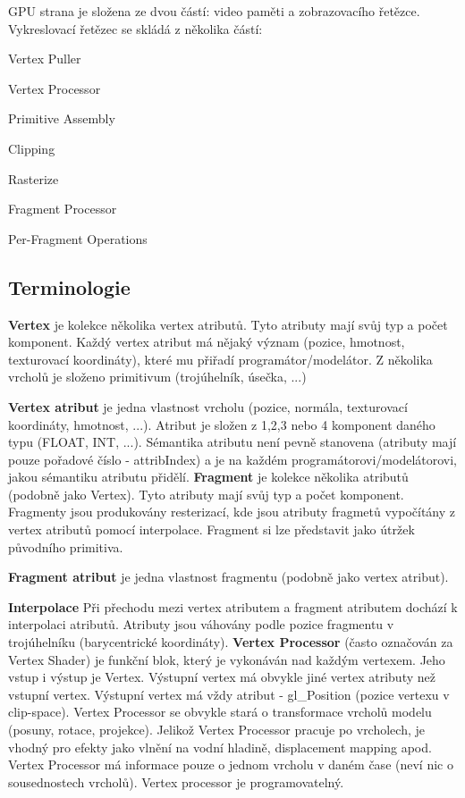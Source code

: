 G\+P\+U strana je složena ze dvou částí\+: video paměti a zobrazovacího řetězce. Vykreslovací řetězec se skládá z několika částí\+:
\begin{DoxyItemize}
\item Vertex Puller
\item Vertex Processor
\item Primitive Assembly
\item Clipping
\item Rasterize
\item Fragment Processor
\item Per-\/\+Fragment Operations
\end{DoxyItemize}\hypertarget{index_terminologie}{}\subsection{Terminologie}\label{index_terminologie}
{\bfseries Vertex} je kolekce několika vertex atributů. Tyto atributy mají svůj typ a počet komponent. Každý vertex atribut má nějaký význam (pozice, hmotnost, texturovací koordináty), které mu přiřadí programátor/modelátor. Z několika vrcholů je složeno primitivum (trojúhelník, úsečka, ...)

{\bfseries Vertex atribut} je jedna vlastnost vrcholu (pozice, normála, texturovací koordináty, hmotnost, ...). Atribut je složen z 1,2,3 nebo 4 komponent daného typu (F\+L\+O\+A\+T, I\+N\+T, ...). Sémantika atributu není pevně stanovena (atributy mají pouze pořadové číslo -\/ attrib\+Index) a je na každém programátorovi/modelátorovi, jakou sémantiku atributu přidělí.  {\bfseries Fragment} je kolekce několika atributů (podobně jako Vertex). Tyto atributy mají svůj typ a počet komponent. Fragmenty jsou produkovány resterizací, kde jsou atributy fragmetů vypočítány z vertex atributů pomocí interpolace. Fragment si lze představit jako útržek původního primitiva.

{\bfseries Fragment atribut} je jedna vlastnost fragmentu (podobně jako vertex atribut).

{\bfseries Interpolace} Při přechodu mezi vertex atributem a fragment atributem dochází k interpolaci atributů. Atributy jsou váhovány podle pozice fragmentu v trojúhelníku (barycentrické koordináty).  {\bfseries Vertex Processor} (často označován za Vertex Shader) je funkční blok, který je vykonáván nad každým vertexem. Jeho vstup i výstup je Vertex. Výstupní vertex má obvykle jiné vertex atributy než vstupní vertex. Výstupní vertex má vždy atribut -\/ gl\+\_\+\+Position (pozice vertexu v clip-\/space). Vertex Processor se obvykle stará o transformace vrcholů modelu (posuny, rotace, projekce). Jelikož Vertex Processor pracuje po vrcholech, je vhodný pro efekty jako vlnění na vodní hladině, displacement mapping apod. Vertex Processor má informace pouze o jednom vrcholu v daném čase (neví nic o sousednostech vrcholů). Vertex processor je programovatelný.

